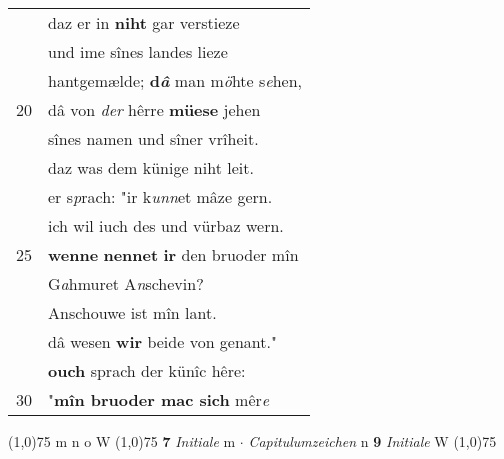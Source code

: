 \documentclass[8pt,a4paper,notitlepage]{article}
\begin{document}
\begin{table}[ht]
\begin{minipage}[t]{0.5\linewidth}
\begin{tabular}{rl}
 & daz er in \textbf{niht} gar verstieze\\ 
 & und ime sînes landes lieze\\ 
 & hantgemælde; \textbf{d\textit{â}} man m\textit{ö}hte s\textit{e}hen,\\ 
20 & dâ von \textit{der} hêrre \textbf{müese} jehen\\ 
 & sînes namen und sîner vrîheit.\\ 
 & daz was dem künige niht leit.\\ 
 & er s\textit{p}rach: "ir k\textit{unn}et mâze gern.\\ 
 & ich wil iuch des und vürbaz wern.\\ 
25 & \textbf{wenne} \textbf{nennet} \textbf{ir} den bruoder mîn\\ 
 & G\textit{a}hmuret A\textit{n}schevin?\\ 
 & Anschouwe ist mîn lant.\\ 
 & dâ wesen \textbf{wir} beide von genant."\\ 
 & \textbf{ouch} sprach der künîc hêre:\\ 
30 & "\textbf{mîn bruoder mac sich} mêr\textit{e}\\ 
\end{tabular}
\scriptsize
\line(1,0){75} \newline
m n o W \newline
\line(1,0){75} \newline
\textbf{7} \textit{Initiale} m   $\cdot$ \textit{Capitulumzeichen} n  \textbf{9} \textit{Initiale} W  \newline
\line(1,0){75} \newline

\end{minipage}
\end{table}
\end{document}
